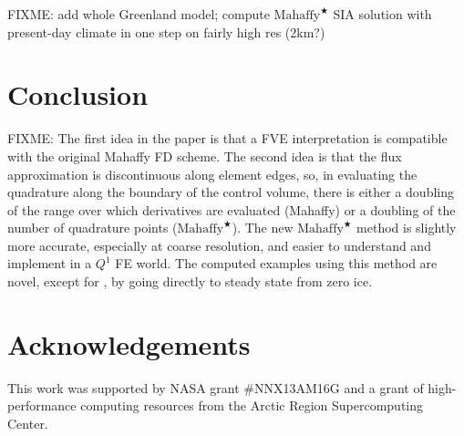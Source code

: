 \documentclass[twocolumn]{igs}
\newcommand{\Mstar}{$\text{Mahaffy}^{\bigstar}$\xspace}
\begin{document}
FIXME: add whole Greenland model; compute \Mstar SIA solution with present-day climate in one step on fairly high res (2km?)


\section{Conclusion} \label{sec:conclusion}

FIXME: The first idea in the paper is that a FVE interpretation is compatible with the original Mahaffy FD scheme.  The second idea is that the flux approximation is discontinuous along element edges, so, in evaluating the quadrature along the boundary of the control volume, there is either a doubling of the range over which derivatives are evaluated (Mahaffy) or a doubling of the number of quadrature points (\Mstar).  The new \Mstar method is slightly more accurate, especially at coarse resolution, and easier to understand and implement in a $Q^1$ FE world.  The computed examples using this method are novel, except for \cite{JouvetBueler2012}, by going directly to steady state from zero ice.

\section*{Acknowledgements}
This work was supported by NASA grant \#NNX13AM16G and a grant of high-performance computing resources from the Arctic Region Supercomputing Center.






\begin{comment}
Here is what the MPAS Land-Ice User's Manual version 3.0 says:

\begin{quote}
\small
Velocities and fluxes are calculated on the midpoint of Voronoi cell edges.  The normal component of surface slope is calculated on cell edges using surface elevation at adjacent cell centers.  The tangential component of surface slope is calculated on cell edges using surface elevation at adjacent vertices. The surface elevation at vertices is calculated from the values at adjacent cell centers using barycentric interpolation. Ice thickness on edges is calculated as the average of the adjacent cell center values (2nd-order approximation).
\end{quote}

Looking at this, and the code, I don't think they think of it as Petrov-Galerkin
\end{comment}
\end{document}
